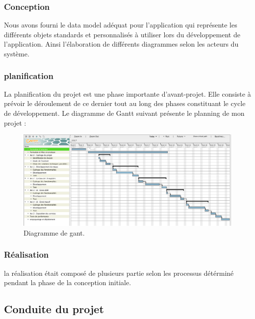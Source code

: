 \documentclass[a4paper, 12pt]{report}
\begin{document}
\subsubsection{	Conception } Nous avons fourni le data model adéquat pour l'application qui représente les différents objets standards et personnalisés à utiliser lors du développement de l'application. Ainsi l'élaboration de différents diagrammes selon les acteurs du système. 
\subsubsection { planification} 
La planification du projet est une phase importante d'avant-projet. Elle consiste à prévoir le déroulement de ce dernier tout au long des phases constituant le cycle de développement.
 Le diagramme de Gantt suivant présente le planning de mon projet :
\begin{figure}[H]
\centering
\includegraphics[scale=0.31]{gantt.png}
\caption{Diagramme de gant.}
\end{figure}

\subsubsection{	Réalisation} la réalisation était composé de plusieurs partie selon les processus détérminé pendant la phase de la conception initiale.  
\subsection{Conduite du projet}
\end{document}
